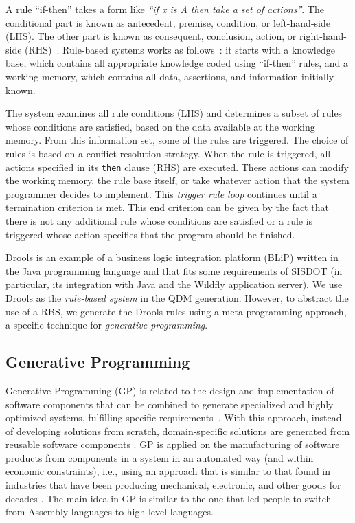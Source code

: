 \documentclass[twocolumn]{bmcart}%
\begin{document}
A rule ``if-then'' takes a form like \emph{``if x is A then take a set of actions''}. The conditional part is known as antecedent, premise, condition, or left-hand-side (LHS). The other part is known as consequent, conclusion, action, or right-hand-side (RHS)~\cite{grosan2011,abraham2005}. Rule-based systems works as follows~\cite{grosan2011}: it starts with a knowledge base, which contains all appropriate knowledge coded using ``if-then'' rules, and a working memory, which contains all data, assertions, and information initially known. 

The system examines all rule conditions (LHS) and determines a subset of rules whose conditions are satisfied, based on the data available at the working memory. From this information set, some of the rules are triggered. The choice of rules is based on a conflict resolution strategy. When the rule is triggered, all actions specified in its \texttt{then} clause (RHS) are executed. These actions can modify the working memory, the rule base itself, or take whatever action that the system programmer decides to implement. This \emph{trigger rule loop} continues until a termination criterion is met. This end criterion can be given by the fact that there is not any additional rule whose conditions are satisfied or a rule is triggered whose action specifies that the program should be finished.

Drools is an example of a business logic integration platform (BLiP) written in the Java programming language and that fits some requirements of SISDOT (in particular, its integration with Java and the Wildfly application server). We use Drools as the \emph{rule-based system} in the QDM generation. However, to abstract the use of a RBS, we generate the Drools rules using a meta-programming approach, a specific technique for \emph{generative programming}. 




\subsection{Generative Programming}
\label{sec:gp}

Generative Programming (GP) is related to the design and implementation of software components that can be combined to generate specialized and highly optimized systems, fulfilling specific requirements~\cite{DBLP:phd/dnb/Czarnecki99}. With this approach, instead of developing solutions from scratch, domain-specific solutions are generated from reusable software components \cite{arora2009}. GP is applied on the manufacturing of software products from components in a system in an automated way (and within economic constraints), i.e., using an approach that is similar to that found in industries that have been producing mechanical, electronic, and other goods for decades \cite{barth2002}. The main idea in GP is similar to the one that led people to switch from Assembly languages to high-level languages. 
\end{document}

